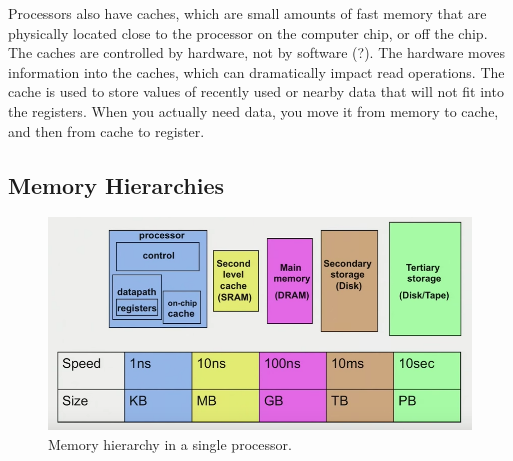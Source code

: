 \documentclass[10pt]{article}
\begin{document}
\begin{flushleft}
Processors also have caches, which are small amounts of fast memory that are physically located close to the processor on the computer chip, or off the chip. The caches are controlled by hardware, not by software (?). The hardware moves information into the caches, which can dramatically impact read operations. The cache is used to store values of recently used or nearby data that will not fit into the registers. When you actually need data, you move it from memory to cache, and then from cache to register. 

\subsection{Memory Hierarchies}

\begin{figure}[H]
\centering
\includegraphics[width=1.0\linewidth]{figures/memory-heirarchy.pdf}
\caption{Memory hierarchy in a single processor.}
\end{figure}


\end{flushleft}
\end{document}
